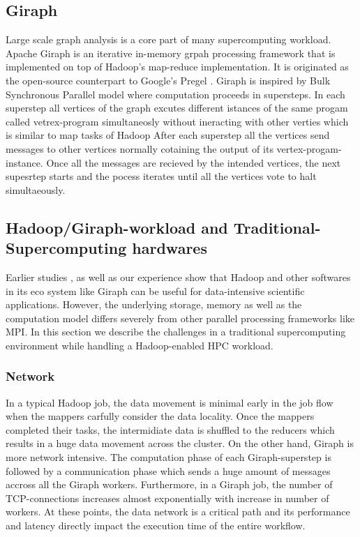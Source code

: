 \documentclass[conference]{IEEEtran}
\begin{document}
\subsection {Giraph}
Large scale graph analysis is a core part of many supercomputing workload.
Apache Giraph is an iterative in-memory grpah processing framework that is implemented on top of Hadoop's map-reduce implementation.
It is originated as the open-source counterpart to Google's Pregel \cite{fw:pregel}.
Giraph is inspired by Bulk Synchronous Parallel model \cite{fw:bsp} where computation proceeds in supersteps.
In each superstep all vertices of the graph excutes different istances of the same progam called vetrex-program simultaneosly without ineracting with other verties which is similar to map tasks of Hadoop
After each superstep all the vertices send messages to other vertices normally cotaining the output of its vertex-progam-instance.
Once all the messages are recieved by the intended vertices, the next supesrtep starts and the pocess iterates until all the vertices vote to halt simultaeously.

\subsection {Hadoop/Giraph-workload and Traditional-Supercomputing hardwares}
Earlier studies \cite{schadoop:fadika}, \cite{schadoop:matsunaga} as well as our experience show that Hadoop and other softwares in its eco system like Giraph can be useful for data-intensive scientific applications. However, the underlying storage, memory as well as the computation model differs severely from other parallel processing frameworks like MPI.
In this section we describe the challenges in a traditional supercomputing environment while handling a Hadoop-enabled HPC workload.
\subsubsection {Network}
In a typical Hadoop job, the data movement is minimal early in the job flow when the mappers carfully consider the data locality. 
Once the mappers completed their tasks, the intermidiate data is shuffled to the reducers which results in a huge data movement across the cluster. 
On the other hand,  Giraph is more network intensive. The computation phase of each Giraph-superstep is followed by a communication phase which sends a huge amount of messages accross all the Giraph workers.
Furthermore, in a Giraph job, the number of TCP-connections increases almost exponentially with increase in number of workers.
At these points, the data network is a critical path and its performance and latency directly impact the execution time of the entire workflow.
\end{document}
